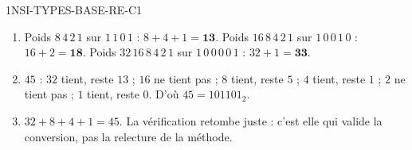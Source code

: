 \begin{corrige}{1NSI-TYPES-BASE-RE-C1}
\begin{enumerate}
  \item Poids $8\,4\,2\,1$ sur $1\,1\,0\,1$ : $8+4+1 = \mathbf{13}$.
        Poids $16\,8\,4\,2\,1$ sur $1\,0\,0\,1\,0$ : $16+2 = \mathbf{18}$.
        Poids $32\,16\,8\,4\,2\,1$ sur $1\,0\,0\,0\,0\,1$ : $32+1 = \mathbf{33}$.
  \item $45$ : $32$ tient, reste $13$ ; $16$ ne tient pas ; $8$ tient, reste $5$ ;
        $4$ tient, reste $1$ ; $2$ ne tient pas ; $1$ tient, reste $0$.
        D'où $45 = 101101_2$.
  \item $32+8+4+1 = 45$. La vérification retombe juste : c'est elle qui valide la conversion,
        pas la relecture de la méthode.
\end{enumerate}
\end{corrige}

